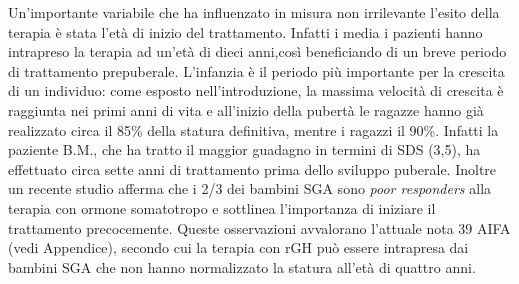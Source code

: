 Un'importante variabile che ha influenzato in misura non irrilevante l'esito della terapia è stata l'età di inizio del trattamento. Infatti i media i pazienti hanno intrapreso la terapia ad un'età di dieci anni,così beneficiando di un breve periodo di trattamento prepuberale. L'infanzia è il periodo più importante per la crescita di un individuo: come esposto nell'introduzione, la massima velocità di crescita è raggiunta nei primi anni di vita e all'inizio della pubertà le ragazze hanno già realizzato circa il 85\% della statura definitiva, mentre i ragazzi il 90\%. Infatti la paziente B.M., che ha tratto il maggior guadagno in termini di SDS (3,5), ha effettuato circa sette anni di trattamento prima dello sviluppo puberale. Inoltre un recente studio afferma che i 2/3 dei bambini SGA sono \textit{poor responders} alla terapia con ormone somatotropo e sottlinea l'importanza di iniziare il trattamento precocemente.%
Queste osservazioni avvalorano l'attuale nota 39 AIFA (vedi Appendice), secondo cui la terapia con rGH può essere intrapresa dai bambini SGA che non hanno normalizzato la statura all'età di quattro anni.


  